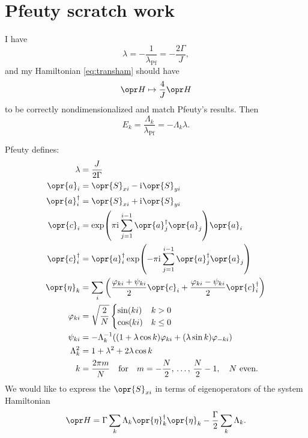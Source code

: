 \documentclass[../thesis.tex]{subfiles}
\begin{document}
\section{Pfeuty scratch work}

I have
\begin{equation}
  \lambda
  = -\frac{1}{\lambda_\text{Pf}}
  = -\frac{2\Gamma}{J},
\end{equation}
and my Hamiltonian \cref{eq:transham} should have
\begin{equation}
  \ham
  \mapsto \frac{4}{J}\ham
\end{equation}
to be correctly nondimensionalized and match Pfeuty's results. Then
\begin{equation}
  E_k
  = \frac{\Lambda_k}{\lambda_\text{Pf}}
  = -\Lambda_k \lambda.
\end{equation}

Pfeuty defines:
\begin{align}
  \lambda
  &= \frac{J}{2\Gamma}
  \label{eq:pflambda} \\
  \opr{a}_i
  &= \opr{S}_{xi} - \im\opr{S}_{yi} 
  \label{eq:pfa} \\
  \opr{a}_i^\dag
  &= \opr{S}_{xi} + \im\opr{S}_{yi} 
  \label{eq:pfadag} \\
  \opr{c}_i
  &= \exp(\pi\im\sum_{j=1}^{i-1} \opr{a}_j^\dag\opr{a}_j)\opr{a}_i
  \label{eq:pfc} \\
  \opr{c}_i^\dag
  &= \opr{a}_i^\dag\exp(-\pi\im\sum_{j=1}^{i-1} \opr{a}_j^\dag\opr{a}_j)
  \label{eq:pfcdag} \\
  \opr{\eta}_k
  &= \sum_i \qty(\frac{\varphi_{ki} + \psi_{ki}}{2}\opr{c}_i
  + \frac{\varphi_{ki} - \psi_{ki}}{2}\opr{c}_i^\dag)
  \label{eq:pfeta} \\
  \varphi_{ki}
  &= \sqrt{\frac{2}{N}}\begin{cases}
    \sin(ki) & k > 0 \\
    \cos(ki) & k \le 0
  \end{cases}
  \label{eq:pfphi} \\
  \psi_{ki}
  &= -\Lambda_k^{-1} \qty((1 + \lambda\cos k)\varphi_{ki}
  + (\lambda\sin k)\varphi_{-ki})
  \label{eq:pfpsi} \\
  \Lambda_k^2
  &= 1 + \lambda^2 + 2\lambda\cos k
  \label{eq:pfLambda} \\
  k
  &= \frac{2\pi m}{N} \qfor m = -\frac{N}{2},\, \ldots,\, \frac{N}{2} - 1,
  \qq{$N$ even.}
  \label{eq:pfk}
\end{align}
We would like to express the $\opr{S}_{xi}$ in terms of eigenoperators of the
system Hamiltonian
\begin{equation}
  \ham
  = \Gamma\sum_k \Lambda_k \opr{\eta}_k^\dag\opr{\eta}_k
  - \frac{\Gamma}{2}\sum_k \Lambda_k.
  \label{eq:pfH}
\end{equation}
\end{document}
